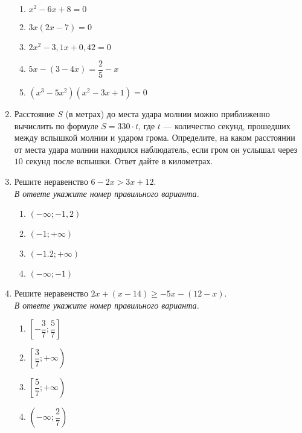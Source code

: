 \documentclass[12pt, a4paper]{article}
\begin{document}
\begin{enumerate}
		\begin{multicols}{2}
			\begin{enumerate}[label=\arabic*)]
				\item $x^2-6x+8=0$
				\item $3x(2x-7)=0$
				\item $2x^2-3,1x+0,42=0$
				\item $5x-(3-4x)=\dfrac{2}{5}-x$
				\item $(x^3-5x^2)(x^2-3x+1)=0$
			\end{enumerate}
		\end{multicols}
		\item Расстояние $S$ (в метрах) до места удара молнии можно приближенно вычислить по формуле $S=330\cdot t$, где $t$ --- количество секунд, прошедших между вспышкой молнии и ударом грома. Определите, на каком расстоянии от места удара молнии находился наблюдатель, если гром он услышал через $10$ секунд после вспышки. Ответ дайте в километрах.
		\newpage
		\item Решите неравенство $6-2x>3x+12$.\\ \textit{В ответе укажите номер правильного варианта.}
		\begin{multicols}{2}
			\begin{enumerate}[label=\arabic*)]
				\item $(-\infty;-1,2)$
				\item $(-1;+\infty)$
				\item $(-1.2;+\infty)$
				\item $(-\infty;-1)$
			\end{enumerate}
		\end{multicols}
		\item Решите неравенство $2x+(x-14)\geq-5x-(12-x)$.\\ \textit{В ответе укажите номер правильного варианта.}
		\begin{multicols}{2}
			\begin{enumerate}[label=\arabic*)]
				\item $\left[-\dfrac{3}{7};\dfrac{5}{7}\right]$
				\item $\left[\dfrac{3}{7};+\infty\right)$
				\item $\left[\dfrac{5}{7};+\infty\right)$
				\item $\left(-\infty;\dfrac{2}{7}\right)$
			\end{enumerate}
		\end{multicols}
	\end{enumerate}
\end{document}
